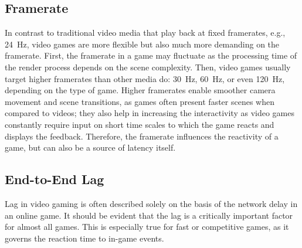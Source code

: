 

\subsection{Framerate}
\label{sec:framerate}

In contrast to traditional video media that play back at fixed framerates, e.g., \SI{24}{\hertz}, video games are more flexible but also much more demanding on the framerate. First, the framerate in a game may fluctuate as the processing time of the render process depends on the scene complexity.
Then, video games usually target higher framerates than other media do: \SI{30}{\hertz}, \SI{60}{\hertz}, or even \SI{120}{\hertz}, depending on the type of game. Higher framerates enable smoother camera movement and scene transitions, as games often present faster scenes when compared to videos; they also help in increasing the interactivity as video games constantly require input on short time scales to which the game reacts and displays the feedback. Therefore, the framerate influences the reactivity of a game, but can also be a source of latency itself.


\subsection{End-to-End Lag}\label{subsec:e2e-lag}

Lag in video gaming is often described solely on the basis of the network delay in an online game. It should be evident that the lag is a critically important factor for almost all games. This is especially true for fast or competitive games, as it governs the reaction time to in-game events.

